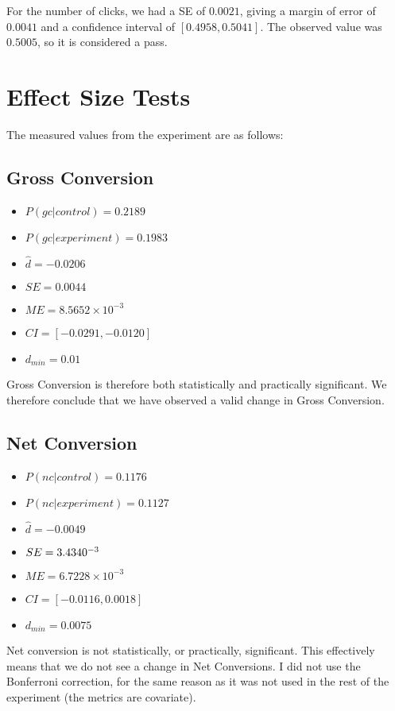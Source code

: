 \documentclass[12pt,a4paper]{article}
\begin{document}
For the number of clicks, we had a SE of $0.0021$, giving a margin of error of
$0.0041$ and a confidence interval of $[ 0.4958, 0.5041 ]$. The observed value
was $0.5005$, so it is considered a pass.

\section{Effect Size Tests}
The measured values from the experiment are as follows:

\subsection{Gross Conversion}
\begin{itemize}
\item $P(gc|control) = 0.2189$
\item $P(gc|experiment) = 0.1983$
\item $\hat{d} = -0.0206$
\item $SE = 0.0044$
\item $ME = 8.5652 \times 10^{-3}$
\item $CI = [-0.0291,-0.0120]$
\item $d_{min} = 0.01$
\end{itemize}

Gross Conversion is therefore both statistically and practically significant. We
therefore conclude that we have observed a valid change in Gross Conversion.

\subsection{Net Conversion}
\begin{itemize}
\item $P(nc|control) = 0.1176$
\item $P(nc|experiment) = 0.1127$
\item $\hat{d} = -0.0049$
\item $SE = 3.4340 \time 10^{-3}$
\item $ME = 6.7228 \times 10^{-3}$
\item $CI = [-0.0116,0.0018]$
\item $d_{min} = 0.0075$
\end{itemize}

Net conversion is not statistically, or practically, significant. This
effectively means that we do not see a change in Net Conversions. I did not use
the Bonferroni correction, for the same reason as it was not used in the rest of
the experiment (the metrics are covariate).
\end{document}
